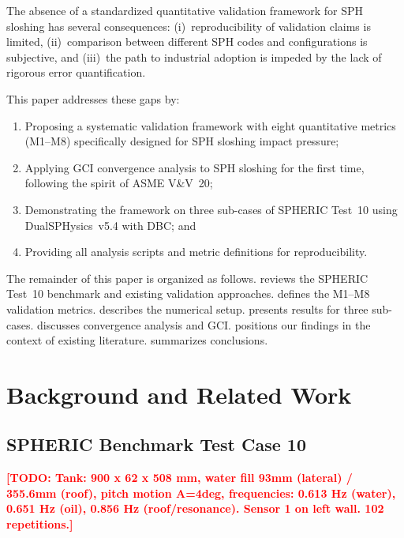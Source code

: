 \documentclass[twocolumn]{svjour3}
\newcommand{\TODO}[1]{\textcolor{red}{\textbf{[TODO: #1]}}}
\begin{document}
The absence of a standardized quantitative validation framework for SPH
sloshing has several consequences:
(i)~reproducibility of validation claims is limited,
(ii)~comparison between different SPH codes and configurations is subjective,
and (iii)~the path to industrial adoption is impeded by the lack of rigorous
error quantification.

This paper addresses these gaps by:
\begin{enumerate}
    \item Proposing a systematic validation framework with eight quantitative
          metrics (M1--M8) specifically designed for SPH sloshing impact
          pressure;
    \item Applying GCI convergence analysis to SPH sloshing for the first time,
          following the spirit of ASME V\&V~20;
    \item Demonstrating the framework on three sub-cases of SPHERIC Test~10
          using DualSPHysics~v5.4 with DBC; and
    \item Providing all analysis scripts and metric definitions for
          reproducibility.
\end{enumerate}

The remainder of this paper is organized as follows.
 reviews the SPHERIC Test~10 benchmark and existing
validation approaches.
 defines the M1--M8 validation metrics.
 describes the numerical setup.
 presents results for three sub-cases.
 discusses convergence analysis and GCI.
 positions our findings in the context of existing
literature.
 summarizes conclusions.


\section{Background and Related Work}
\label{sec:background}

\subsection{SPHERIC Benchmark Test Case 10}
\label{sec:spheric-test10}

\TODO{Tank: 900 x 62 x 508 mm, water fill 93mm (lateral) / 355.6mm (roof),
pitch motion A=4deg, frequencies: 0.613 Hz (water), 0.651 Hz (oil),
0.856 Hz (roof/resonance). Sensor 1 on left wall. 102 repetitions.}
\end{document}
